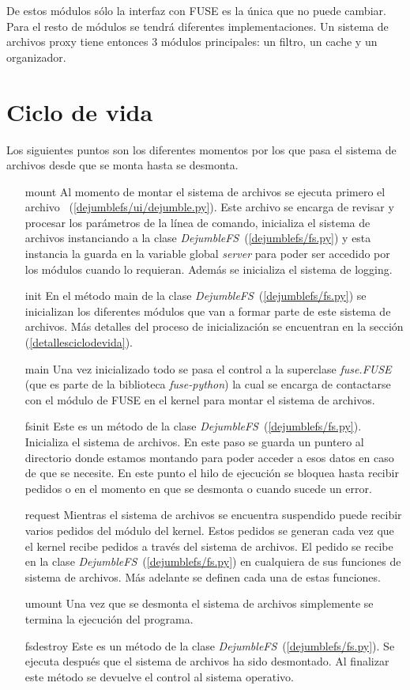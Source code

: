 De estos módulos sólo la interfaz con FUSE es la única que no puede cambiar. Para el resto de módulos se tendrá diferentes implementaciones. Un sistema de archivos proxy tiene entonces 3 módulos principales: un filtro, un cache y un organizador.


\section{Ciclo de vida}

Los siguientes puntos son los diferentes momentos por los que pasa el sistema de archivos desde que se monta hasta se desmonta.

\begin{itemize}
\item[mount] Al momento de montar el sistema de archivos se ejecuta primero el archivo ~(\ref{dejumblefs/ui/dejumble.py}). Este archivo se encarga de revisar y procesar los parámetros de la línea de comando, inicializa el sistema de archivos instanciando a la clase \textit{DejumbleFS}~(\ref{dejumblefs/fs.py}) y esta instancia la guarda en la variable global \textit{server} para poder ser accedido por los módulos cuando lo requieran. Además se inicializa el sistema de logging.
\item[init] En el método main de la clase \textit{DejumbleFS}~(\ref{dejumblefs/fs.py}) se inicializan los diferentes módulos que van a formar parte de este sistema de archivos. Más detalles del proceso de inicialización se encuentran en la sección (\ref{detallesciclodevida}).
\item[main] Una vez inicializado todo se pasa el control a la superclase \textit{fuse.FUSE} (que es parte de la biblioteca \textit{fuse-python}) la cual se encarga de contactarse con el módulo de FUSE en el kernel para montar el sistema de archivos.
\item[fsinit] Este es un método de la clase \textit{DejumbleFS}~(\ref{dejumblefs/fs.py}). Inicializa el sistema de archivos. En este paso se guarda un puntero al directorio donde estamos montando para poder acceder a esos datos en caso de que se necesite. En este punto el hilo de ejecución se bloquea hasta recibir pedidos o en el momento en que se desmonta o cuando sucede un error.
\item[request] Mientras el sistema de archivos se encuentra suspendido puede recibir varios pedidos del módulo del kernel. Estos pedidos se generan cada vez que el kernel recibe pedidos a través del sistema de archivos. El pedido se recibe en la clase \textit{DejumbleFS}~(\ref{dejumblefs/fs.py}) en cualquiera de sus funciones de sistema de archivos. Más adelante se definen cada una de estas funciones.
\item[umount] Una vez que se desmonta el sistema de archivos simplemente se termina la ejecución del programa.
\item[fsdestroy] Este es un método de la clase \textit{DejumbleFS}~(\ref{dejumblefs/fs.py}). Se ejecuta después que el sistema de archivos ha sido desmontado. Al finalizar este método se devuelve el control al sistema operativo.
\end{itemize}

